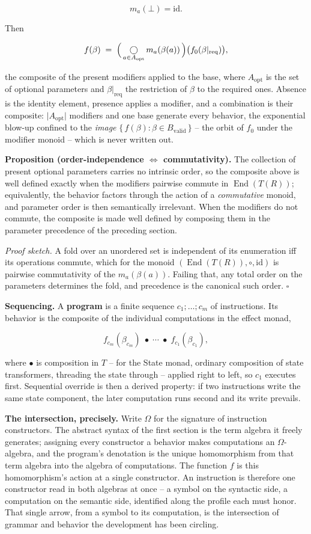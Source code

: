\documentclass[11pt]{article}
\begin{document}
\[
  m_a(\bot)=\mathrm{id}.
\]

Then

\[
  f(\beta) \;=\;
  \Bigl(\,\mathop{\bigcirc}\limits_{a\in A_{\mathrm{opt}}} m_a(\beta(a))\,\Bigr)
  \bigl(f_0(\beta|_{\mathrm{req}})\bigr),
\]

the composite of the present modifiers applied to the base, where
\(A_{\mathrm{opt}}\) is the set of optional parameters and
\(\beta|_{\mathrm{req}}\) the restriction of \(\beta\) to the required ones.
Absence is the identity element, presence applies a modifier, and a combination is
their composite: \(\lvert A_{\mathrm{opt}}\rvert\) modifiers and one base generate
every behavior, the exponential blow-up confined to the \emph{image}
\(\{\,f(\beta):\beta\in B_{\mathrm{valid}}\,\}\) -- the orbit of \(f_0\) under the
modifier monoid -- which is never written out.

\textbf{Proposition (order-independence \(\iff\) commutativity).} The collection
of present optional parameters carries no intrinsic order, so the composite above
is well defined exactly when the modifiers pairwise commute in
\(\operatorname{End}(T(R))\); equivalently, the behavior factors through the action
of a \emph{commutative} monoid, and parameter order is then semantically
irrelevant. When the modifiers do not commute, the composite is made well defined
by composing them in the parameter precedence of the preceding section.

\emph{Proof sketch.} A fold over an unordered set is independent of its
enumeration iff its operations commute, which for the monoid
\((\operatorname{End}(T(R)),\circ,\mathrm{id})\) is pairwise commutativity of the
\(m_a(\beta(a))\). Failing that, any total order on the parameters determines the
fold, and precedence is the canonical such order. \(\square\)

\textbf{Sequencing.} A \textbf{program} is a finite sequence \(c_1;\dots;c_m\) of
instructions. Its behavior is the composite of the individual computations in the
effect monad,

\[
  f_{c_m}(\beta_{c_m}) \;\bullet\; \cdots \;\bullet\; f_{c_1}(\beta_{c_1}),
\]

where \(\bullet\) is composition in \(T\) -- for the State monad, ordinary
composition of state transformers, threading the state through -- applied right to
left, so \(c_1\) executes first. Sequential override is then a derived property:
if two instructions write the same state component, the later computation runs
second and its write prevails.

\textbf{The intersection, precisely.} Write \(\Omega\) for the signature of
instruction constructors. The abstract syntax of the first section is the term
algebra it freely generates; assigning every constructor a behavior makes
computations an \(\Omega\)-algebra, and the program's denotation is the unique
homomorphism from that term algebra into the algebra of computations. The function
\(f\) is this homomorphism's action at a single constructor. An instruction is
therefore one constructor read in both algebras at once -- a symbol on the
syntactic side, a computation on the semantic side, identified along the profile
each must honor. That single arrow, from a symbol to its computation, is the
intersection of grammar and behavior the development has been circling.
\end{document}
